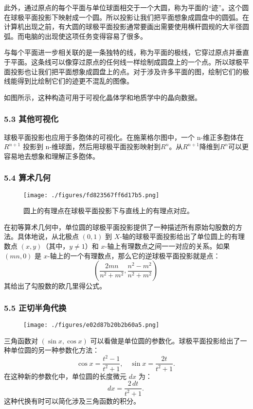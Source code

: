 此外，通过原点的每个平面与单位球面相交于一个大圆，称为平面的“迹”。这个圆在球极平面投影下映射成一个圆。所以投影让我们把平面想象成圆盘中的圆弧。在计算机出现之前，有大圆的球极平面投影通常要画出需要使用横杆圆规的大半径圆弧。而电脑的出现使这项任务变得容易了很多。

与每个平面进一步相关联的是一条独特的线，称为平面的极线，它穿过原点并垂直于平面。这条线可以像穿过原点的任何线一样绘制成圆盘上的一个点。所以球极平面投影也让我们把平面想象成圆盘上的点。对于涉及许多平面的图，绘制它们的极线能得到比绘制它们的迹更不混乱的图像。

如图所示，这种构造可用于可视化晶体学和地质学中的晶向数据。
\subsubsection{5.3 其他可视化}
球极平面投影也应用于多胞体的可视化。在施莱格尔图中，一个 n-维正多胞体在 $R^{n+1}$ 投影到 n-维球面，然后用球极平面投影映射到$R^n$。从$R^{n+1}$降维到$R^n$可以更容易地去想象和理解正多胞体。
\subsubsection{5.4 算术几何}
\begin{figure}[ht]
\centering
\texttt{[image: ./figures/fd823567ff6d17b5.png]}
\caption{圆上的有理点在球极平面投影下与直线上的有理点对应。} \label{fig_QJPMTY_19}
\end{figure}
在初等算术几何中，单位圆的球极平面投影提供了一种描述所有原始勾股数的方法。具体地说，从北极点 \((0, 1)\) 到 \(X\)-轴的球极平面投影给出了单位圆上的有理数点 \((x, y)\)（其中，\(y \neq 1\)）和 \(x\)-轴上有理数点之间一一对应的关系。如果 \((mn, 0)\) 是 \(x\)-轴上的一个有理数点，那么它的逆球极平面投影就是点：
$$\left( \frac{2mn}{n^2 + m^2}, \frac{n^2 - m^2}{n^2 + m^2} \right)~$$
其给出了勾股数的欧几里得公式。
\subsubsection{5.5 正切半角代换}
\begin{figure}[ht]
\centering
\texttt{[image: ./figures/e02d87b20b2b60a5.png]}
\caption{} \label{fig_QJPMTY_20}
\end{figure}
三角函数对 $\left(\sin x, \cos x\right)$ 可以看做是单位圆的参数化。球极平面投影给出了一种单位圆的另一种参数化方法：
$$\cos x = \frac{t^2 - 1}{t^2 + 1}, \quad \sin x = \frac{2t}{t^2 + 1}.~$$
在这种新的参数化中，单位圆的长度微元 $dx$ 为：
$$dx = \frac{2 \, dt}{t^2 + 1}.~$$
这种代换有时可以简化涉及三角函数的积分。

